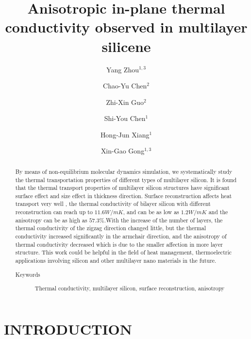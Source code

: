 \documentclass[%
 reprint,
 amsmath,amssymb,
 aps,
 prb,
]{revtex4-1}
\begin{document}
\title{Anisotropic in-plane thermal conductivity observed in multilayer silicene}
\author{Yang Zhou${}^{1,3}$}
\author{Chao-Yu Chen${}^{2}$}
\author{Zhi-Xin Guo${}^{2}$}
\author{Shi-You Chen${}^{1}$}
\author{Hong-Jun Xiang${}^{1}$}
\author{Xin-Gao Gong${}^{1,3}$}
\begin{abstract}
  By means of non-equilibrium molecular dynamics simulation, we systematically study the thermal transportation properties of different types of multilayer silicon. It is found that the thermal transport properties of multilayer silicon structures have significant surface effect and size effect in thickness direction. Surface reconstruction affects heat transport very well , the thermal conductivity of bilayer silicon with different reconstruction can reach up to $11.6 W/mK$, and can be as low as $1.2 W/mK$ and the anisotropy can be as high as $57.3\%$.With the increase of the number of layers, the thermal conductivity of the zigzag direction changed little, but the thermal conductivity increased significantly in the armchair direction, and the anisotropy of thermal conductivity decreased which is due to the smaller affection in more layer structure. This work could be helpful in the field of heat management, thermoelectric applications involving silicon and other multilayer nano materials in the future.
  \begin{description}
    \item[Keywords]
          Thermal conductivity, multilayer silicon, surface reconstruction, anisotropy
  \end{description}
\end{abstract}

\maketitle

\section{INTRODUCTION}
\end{document}
